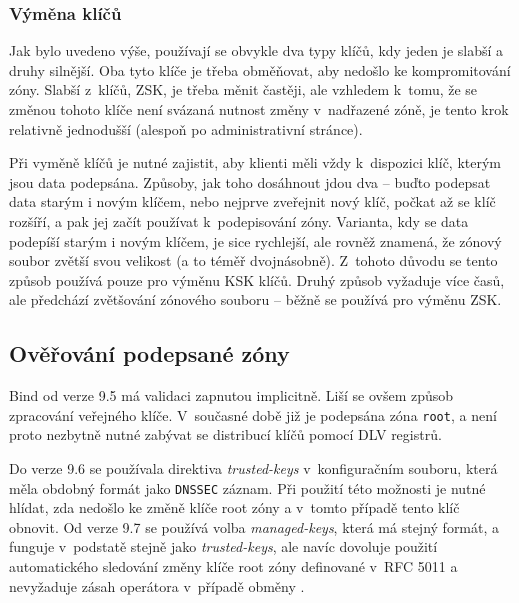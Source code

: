 \subsubsection*{Výměna klíčů}
Jak bylo uvedeno výše, používají se obvykle dva typy klíčů, kdy jeden je slabší a druhy silnější. Oba tyto klíče je třeba obměňovat, aby nedošlo ke kompromitování zóny. Slabší z~klíčů, ZSK, je třeba měnit častěji, ale vzhledem k~tomu, že se změnou tohoto klíče není svázaná nutnost změny v~nadřazené zóně, je tento krok relativně jednodušší (alespoň po administrativní stránce).

Při vyměně klíčů je nutné zajistit, aby klienti měli vždy k~dispozici klíč, kterým jsou data podepsána. Způsoby, jak toho dosáhnout jdou dva -- buďto podepsat data starým i novým klíčem, nebo nejprve zveřejnit nový klíč, počkat až se klíč rozšíří, a pak jej začít používat k~podepisování zóny. Varianta, kdy se data podepíší starým i novým klíčem, je sice rychlejší, ale rovněž znamená, že zónový soubor zvětší svou velikost (a to téměř dvojnásobně). Z~tohoto důvodu se tento způsob používá pouze pro výměnu KSK klíčů. Druhý způsob vyžaduje více časů, ale předchází zvětšování zónového souboru -- běžně se používá pro výměnu ZSK.

\subsection{Ověřování podepsané zóny}
Bind od verze 9.5 má validaci zapnutou implicitně. Liší se ovšem způsob zpracování veřejného klíče. V~současné době již je podepsána zóna {\tt root}, a není proto nezbytně nutné zabývat se distribucí klíčů pomocí DLV registrů.

Do verze 9.6 se používala direktiva {\em trusted-keys} v~konfiguračním souboru, která měla obdobný formát jako {\tt DNSSEC} záznam. Při použití této možnosti je nutné hlídat, zda nedošlo ke změně klíče root zóny a v~tomto případě tento klíč obnovit. Od verze 9.7 se používá volba {\em managed-keys}, která má stejný formát, a funguje v~podstatě stejně jako {\em trusted-keys}, ale navíc dovoluje použití automatického sledování změny klíče root zóny definované v~RFC 5011 a nevyžaduje zásah operátora v~případě obměny \cite{RFC5011}.

%
